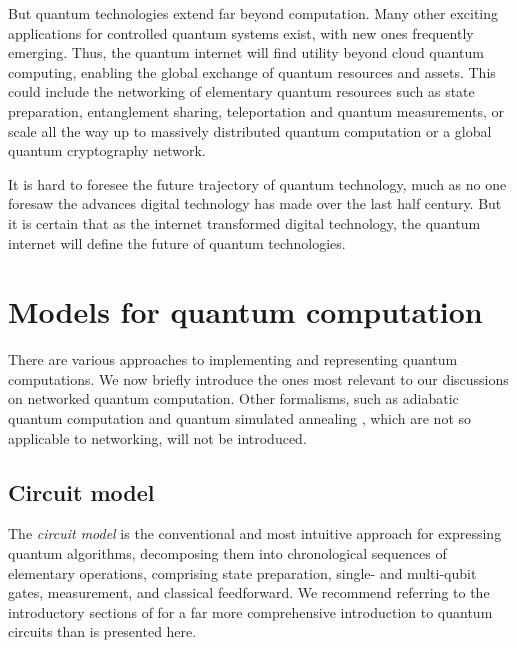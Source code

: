 \documentclass[aps,rmp,twocolumn,amsmath,amssymb,nofootinbib,superscriptaddress,longbibliography,floatfix,table-of-contents,eqsecnum]{revtex4-1}
\begin{document}
But quantum technologies extend far beyond computation. Many other exciting applications for controlled quantum systems exist, with new ones frequently emerging. Thus, the quantum internet will find utility beyond cloud quantum computing, enabling the global exchange of quantum resources and assets. This could include the networking of elementary quantum resources such as state preparation, entanglement sharing, teleportation and quantum measurements, or scale all the way up to massively distributed quantum computation or a global quantum cryptography network.

It is hard to foresee the future trajectory of quantum technology, much as no one foresaw the advances digital technology has made over the last half century. But it is certain that as the internet transformed digital technology, the quantum internet will define the future of quantum technologies.

%
%

\section{Models for quantum computation} \label{sec:models_QC} 

There are various approaches to implementing and representing quantum computations. We now briefly introduce the ones most relevant to our discussions on networked quantum computation. Other formalisms, such as adiabatic quantum computation \cite{???} and quantum simulated annealing \cite{???}, which are not so applicable to networking, will not be introduced.

%
%

\subsection{Circuit model} \label{sec:circuit_model} 

The \textit{circuit model} is the conventional and most intuitive approach for expressing quantum algorithms, decomposing them into chronological sequences of elementary operations, comprising state preparation, single- and multi-qubit gates, measurement, and classical feedforward. We recommend referring to the introductory sections of \cite{bib:NielsenChuang00} for a far more comprehensive introduction to quantum circuits than is presented here.
\end{document}
